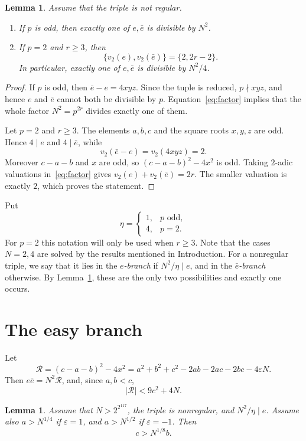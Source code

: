 \documentclass[11pt]{amsart}
\newtheorem{lemma}[theorem]{Lemma}
\theoremstyle{remark}
\newcommand{\eps}{\varepsilon}
\newcommand{\vtwo}{v_2}
\begin{document}
\begin{lemma}%
\label{lem:local}
Assume that the triple is not regular.
\begin{enumerate}
\item If $p$ is odd, then exactly one of $e,\bar e$ is divisible by $N^2$.
\item If $p=2$ and $r\ge3$, then
\[
 \{\vtwo(e),\vtwo(\bar e)\}=\{2,2r-2\}.
\]
In particular, exactly one of $e,\bar e$ is divisible by $N^2/4$.
\end{enumerate}
\end{lemma}

\begin{proof}
If $p$ is odd, then $\bar e-e=4xyz$.  Since the tuple is reduced,
$p\nmid xyz$, and hence $e$ and $\bar e$ cannot both be divisible by $p$.
Equation~\eqref{eq:factor} implies that the whole factor $N^2=p^{2r}$
divides exactly one of them.

Let $p=2$ and $r\ge3$.  The elements $a,b,c$ and the square roots $x,y,z$
are odd.  Hence $4\mid e$ and $4\mid\bar e$, while
\[
 \vtwo(\bar e-e)=\vtwo(4xyz)=2.
\]
Moreover $c-a-b$ and $x$ are odd, so $(c-a-b)^2-4x^2$ is odd.  Taking
$2$-adic valuations in~\eqref{eq:factor} gives
$\vtwo(e)+\vtwo(\bar e)=2r$.  The smaller valuation is exactly $2$, which
proves the statement.
\end{proof}

Put
\[
 \eta=\begin{cases}
 1,&p\text{ odd},\\
 4,&p=2.
 \end{cases}
\]
For $p=2$ this notation will only be used when $r\ge3$. 
Note that the cases $N=2,4$ are solved by the results mentioned in Introduction. 
For a nonregular triple, we
say that it lies in the \emph{$e$-branch} if $N^2/\eta\mid e$, and in the
\emph{$\bar e$-branch} otherwise. By Lemma~\ref{lem:local}, these are the
only two possibilities and exactly one occurs.

\section{The easy branch}

Let
\[
 \mathcal R=(c-a-b)^2-4x^2
 =a^2+b^2+c^2-2ab-2ac-2bc-4\eps N.
\]
Then $e\bar e=N^2\mathcal R$, and, since $a,b<c$,
\begin{equation}\label{eq:Rbound}
 |\mathcal R|<9c^2+4N.
\end{equation}

\begin{lemma}%
\label{lem:easy}
Assume that $N>2^{2^{117}}$, the triple is nonregular, and
$N^2/\eta\mid e$.  Assume also $a>N^{1/4}$ if $\eps=1$, and
$a>N^{1/2}$ if $\eps=-1$.  Then
\[
 c>N^{1/8}b.
\]
\end{lemma}
\end{document}
